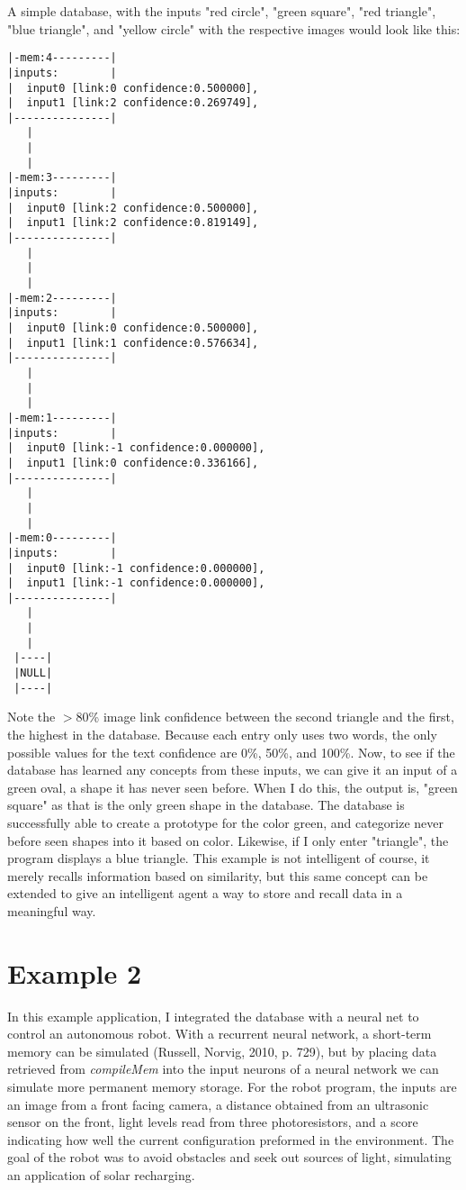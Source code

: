 \documentclass{report}
\begin{document}
A simple database, with the inputs "red circle", "green square", "red triangle", "blue triangle", and "yellow circle" with the respective images would look like this:
\newpage
\begin{lstlisting}
|-mem:4---------|
|inputs:        |
|  input0 [link:0 confidence:0.500000], 
|  input1 [link:2 confidence:0.269749], 
|---------------|
   |
   |
   |
|-mem:3---------|
|inputs:        |
|  input0 [link:2 confidence:0.500000], 
|  input1 [link:2 confidence:0.819149], 
|---------------|
   |
   |
   |
|-mem:2---------|
|inputs:        |
|  input0 [link:0 confidence:0.500000], 
|  input1 [link:1 confidence:0.576634], 
|---------------|
   |
   |
   |
|-mem:1---------|
|inputs:        |
|  input0 [link:-1 confidence:0.000000], 
|  input1 [link:0 confidence:0.336166], 
|---------------|
   |
   |
   |
|-mem:0---------|
|inputs:        |
|  input0 [link:-1 confidence:0.000000], 
|  input1 [link:-1 confidence:0.000000], 
|---------------|
   |
   |
   |
 |----|
 |NULL|
 |----|
\end{lstlisting}
Note the $>$80\% image link confidence between the second triangle and the first, the highest in the database. Because each entry only uses two words, the only possible values for the text confidence are 0\%, 50\%, and 100\%. Now, to see if the database has learned any concepts from these inputs, we can give it an input of a green oval, a shape it has never seen before. When I do this, the output is, "green square" as that is the only green shape in the database. The database is successfully able to create a prototype for the color green, and categorize never before seen shapes into it based on color. Likewise, if I only enter "triangle", the program displays a blue triangle. This example is not intelligent of course, it merely recalls information based on similarity, but this same concept can be extended to give an intelligent agent a way to store and recall data in a meaningful way.

\section{Example 2}
In this example application, I integrated the database with a neural net to control an autonomous robot. With a recurrent neural network, a short-term memory can be simulated (Russell, Norvig, 2010, p. 729), but by placing data retrieved from \textit{compileMem} into the input neurons of a neural network we can simulate more permanent memory storage. For the robot program, the inputs are an image from a front facing camera, a distance obtained from an ultrasonic sensor on the front, light levels read from three photoresistors, and a score indicating how well the current configuration preformed in the environment. The goal of the robot was to avoid obstacles and seek out sources of light, simulating an application of solar recharging. 
\end{document}
